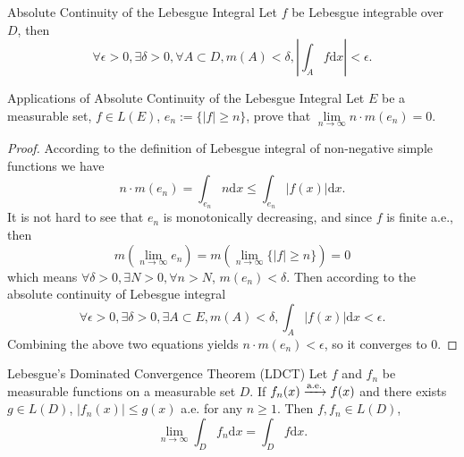 \begin{theorem}{Absolute Continuity of the Lebesgue Integral}{}
  Let $f$ be Lebesgue integrable over $D$,
  then
  \begin{equation}
    \forall \epsilon > 0, \exists \delta > 0, \forall A \subset D,
    m(A) < \delta, \left| \int_A f \mathrm{d} x \right| < \epsilon.
  \end{equation}
\end{theorem}

\begin{example}{Applications of Absolute Continuity of the Lebesgue Integral}{}
  Let $E$ be a measurable set, $f \in L(E)$, $e_n := \{|f| \geq n\}$,
  prove that $\lim \limits _{n \rightarrow \infty} n \cdot m(e_n) = 0$.
\end{example}

\begin{proof}
  According to the definition of Lebesgue integral of non-negative simple
  functions we have
  \begin{equation}
    n \cdot m(e_n) = \int_{e_n} n \mathrm{d} x \leq \int_{e_n} |f(x)|\mathrm{d} x.
  \end{equation}
  It is not hard to see that $e_n$ is monotonically decreasing,
  and since $f$ is finite a.e., then
  \begin{equation}
    m(\lim \limits _{n \rightarrow \infty} e_n)
    = m(\lim \limits _{n \rightarrow \infty} \{|f| \geq n\}) = 0
  \end{equation}
  which means $\forall \delta > 0, \exists N > 0, \forall n > N$, $m(e_n) < \delta$.
  Then according to the absolute continuity of Lebesgue integral
  \begin{equation}
    \forall \epsilon > 0, \exists \delta > 0, \exists A \subset E, m(A) < \delta,
    \int_A |f(x)|\mathrm{d} x < \epsilon.
  \end{equation}
  Combining the above two equations yields $n\cdot m(e_n) < \epsilon$,
  so it converges to $0$.
\end{proof}

\begin{theorem}{Lebesgue's Dominated Convergence Theorem (LDCT)}{}
  Let $f$ and $f_n$ be measurable functions on a measurable set $D$.
  If $f_n(x) \xrightarrow{\text{a.e.}} f(x)$ and there exists $g \in L(D)$,
  $|f_n(x)| \leq g(x)$ a.e. for any $n \geq 1$.
  Then $f, f_n \in L(D)$,
  \begin{equation}
    \lim \limits _{n \rightarrow \infty} \int_D f_n\mathrm{d} x
    = \int_D f\mathrm{d}x.
  \end{equation}
\end{theorem}

